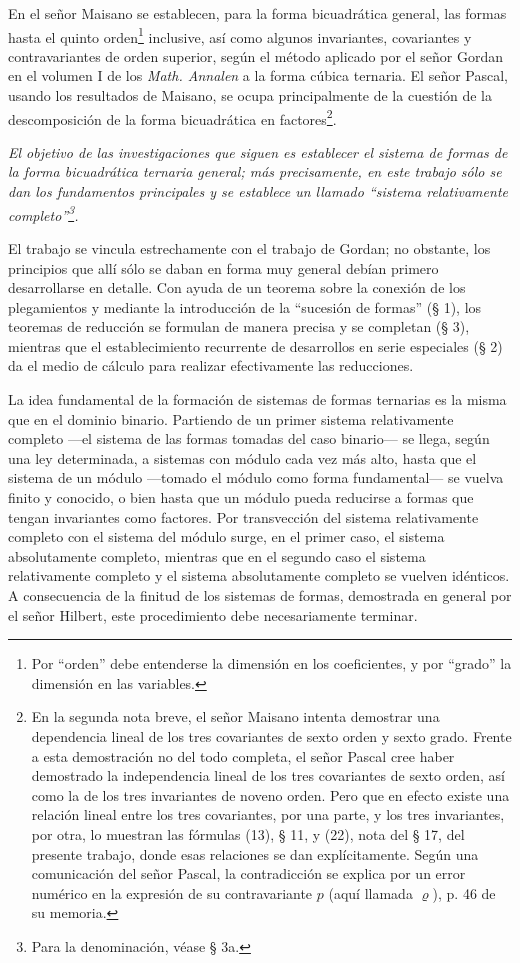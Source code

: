 \documentclass[11pt]{article}
\begin{document}
En el señor Maisano se establecen, para la forma bicuadrática general, las formas hasta el quinto orden\footnote{Por ``orden'' debe entenderse la dimensión en los coeficientes, y por ``grado'' la dimensión en las variables.} inclusive, así como algunos invariantes, covariantes y contravariantes de orden superior, según el método aplicado por el señor Gordan en el volumen I de los \emph{Math. Annalen} a la forma cúbica ternaria. El señor Pascal, usando los resultados de Maisano, se ocupa principalmente de la cuestión de la descomposición de la forma bicuadrática en factores\footnote{En la segunda nota breve, el señor Maisano intenta demostrar una dependencia lineal de los tres covariantes de sexto orden y sexto grado. Frente a esta demostración no del todo completa, el señor Pascal cree haber demostrado la independencia lineal de los tres covariantes de sexto orden, así como la de los tres invariantes de noveno orden. Pero que en efecto existe una relación lineal entre los tres covariantes, por una parte, y los tres invariantes, por otra, lo muestran las fórmulas (13), § 11, y (22), nota del § 17, del presente trabajo, donde esas relaciones se dan explícitamente. Según una comunicación del señor Pascal, la contradicción se explica por un error numérico en la expresión de su contravariante $p$ (aquí llamada $\varrho$), p. 46 de su memoria.}.

\emph{El objetivo de las investigaciones que siguen es establecer el sistema de formas de la forma bicuadrática ternaria general; más precisamente, en este trabajo sólo se dan los fundamentos principales y se establece un llamado ``sistema relativamente completo''\footnote{Para la denominación, véase § 3a.}.}

El trabajo se vincula estrechamente con el trabajo de Gordan; no obstante, los principios que allí sólo se daban en forma muy general debían primero desarrollarse en detalle. Con ayuda de un teorema sobre la conexión de los plegamientos y mediante la introducción de la ``sucesión de formas'' (§ 1), los teoremas de reducción se formulan de manera precisa y se completan (§ 3), mientras que el establecimiento recurrente de desarrollos en serie especiales (§ 2) da el medio de cálculo para realizar efectivamente las reducciones.

La idea fundamental de la formación de sistemas de formas ternarias es la misma que en el dominio binario. Partiendo de un primer sistema relativamente completo ---el sistema de las formas tomadas del caso binario--- se llega, según una ley determinada, a sistemas con módulo cada vez más alto, hasta que el sistema de un módulo ---tomado el módulo como forma fundamental--- se vuelva finito y conocido, o bien hasta que un módulo pueda reducirse a formas que tengan invariantes como factores. Por transvección del sistema relativamente completo con el sistema del módulo surge, en el primer caso, el sistema absolutamente completo, mientras que en el segundo caso el sistema relativamente completo y el sistema absolutamente completo se vuelven idénticos. A consecuencia de la finitud de los sistemas de formas, demostrada en general por el señor Hilbert, este procedimiento debe necesariamente terminar.
\end{document}
